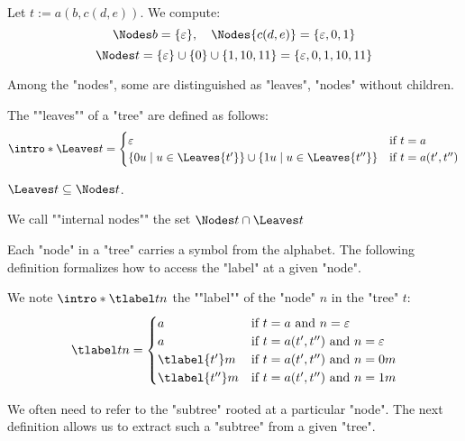 \documentclass[a4paper,UKenglish,cleveref, autoref, thm-restate]{lipics-v2021}
\begin{document}
\begin{example}
	Let $ t := a(b, c(d, e)) $. We compute:
	\[
		\Nodes b  = \{\varepsilon\}, \quad \Nodes {c(d, e)} = \{\varepsilon, 0, 1\}
	\]
	\[
		\Nodes t = \{\varepsilon\} \cup \{0\} \cup \{1, 10, 11\} = \{\varepsilon, 0, 1, 10, 11\}
	\]
\end{example}

Among the "nodes", some are distinguished as "leaves", "nodes" without children.

\begin{definition}["Leaves"]
	\AP The ""leaves"" of a "tree" are defined as follows:
	\[
		\intro* \Leaves t = \begin{cases}
			\varepsilon                              & \text{if } t = a         \\
			\setdef {0u} {u \in \Leaves {t'}}
			\cup \setdef {1u} {u \in \Leaves {t''} } & \text{if } t = a(t',t'')
		\end{cases}
	\]
\end{definition}

\begin{remark}
	$\Leaves t \subseteq \Nodes t$.
\end{remark}

\begin{definition}
	We call ""internal nodes"" the set $\Nodes t \cap \Leaves t$
\end{definition}


Each "node" in a "tree" carries a symbol from the alphabet. The following definition formalizes how to
access the "label" at a given "node".

\begin{definition}
	\AP We note $\intro* \tlabel t n$ the ""label"" of the "node" $n$ in the "tree" $t$:
	\[
		\tlabel t n =   \begin{cases}
			a               & \text{if } t = a \text{ and } n = \varepsilon         \\
			a               & \text{if } t = a(t',t'') \text{ and } n = \varepsilon \\
			\tlabel {t'} m  & \text{if } t = a(t',t'') \text{ and } n = 0m          \\
			\tlabel {t''} m & \text{if } t = a(t',t'') \text{ and } n = 1m
		\end{cases}
	\]
\end{definition}

We often need to refer to the "subtree" rooted at a particular "node". The next definition allows us to
extract such a "subtree" from a given "tree".
\end{document}
